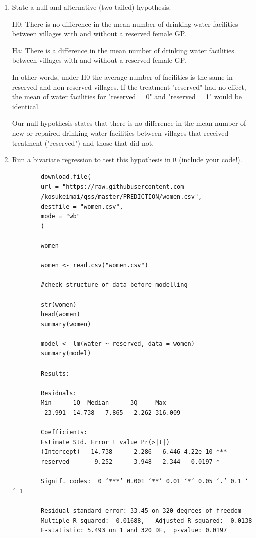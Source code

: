 \documentclass[12pt,letterpaper]{article}
\begin{document}
\newpage
\begin{enumerate}
	\item [(a)] State a null and alternative (two-tailed) hypothesis. 
	

	H0: There is no difference in the mean number of drinking water facilities between villages with and without a reserved female GP.
	
	Ha: There is a difference in the mean number of drinking water facilities between villages with and without a reserved female GP.
	
	In other words, under H0 the average number of facilities is the same in reserved and non-reserved villages. If the treatment "reserved" had no effect, the mean of water facilities for "reserved = 0" and "reserved = 1" would be identical.
	
	Our null hypothesis states that there is no difference in the mean number of new or repaired drinking water facilities between villages that received treatment ("reserved") and those that did not.
	
	
	\vspace{6cm}
	\item [(b)] Run a bivariate regression to test this hypothesis in \texttt{R} (include your code!).
	
	\begin{Verbatim}
		download.file(
		url = "https://raw.githubusercontent.com
		/kosukeimai/qss/master/PREDICTION/women.csv",
		destfile = "women.csv",
		mode = "wb"
		)
		
		women
		
		women <- read.csv("women.csv")
		
		#check structure of data before modelling 
		
		str(women)
		head(women)
		summary(women)
		
		model <- lm(water ~ reserved, data = women)
		summary(model)

		Results:
		
		Residuals:
		Min      1Q  Median      3Q     Max 
		-23.991 -14.738  -7.865   2.262 316.009 
		
		Coefficients:
		Estimate Std. Error t value Pr(>|t|)    
		(Intercept)   14.738      2.286   6.446 4.22e-10 ***
		reserved       9.252      3.948   2.344   0.0197 *  
		---
		Signif. codes:  0 ‘***’ 0.001 ‘**’ 0.01 ‘*’ 0.05 ‘.’ 0.1 ‘ ’ 1
		
		Residual standard error: 33.45 on 320 degrees of freedom
		Multiple R-squared:  0.01688,	Adjusted R-squared:  0.0138 
		F-statistic: 5.493 on 1 and 320 DF,  p-value: 0.0197
		

\end{Verbatim}
\end{enumerate}
\end{document}
